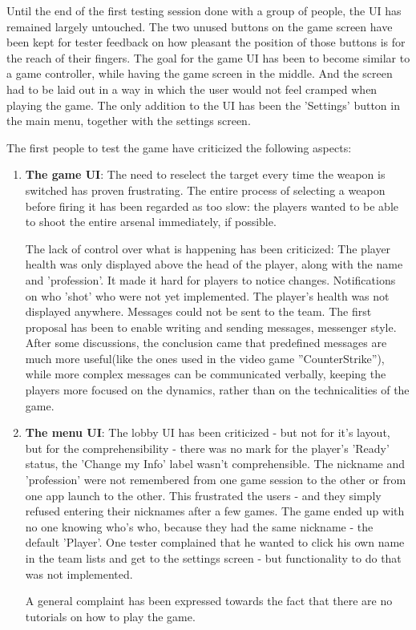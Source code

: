 Until the end of the first testing session done with a group of people, the UI
has remained largely untouched. The two unused buttons on the game screen have
been kept for tester feedback on how pleasant the position of those buttons is
for the reach of their fingers. The goal for the game UI has been to become
similar to a game controller, while having the game screen in the middle. And
the screen had to be laid out in a way in which the user would not feel cramped
when playing the game. The only addition to the UI has been the 'Settings'
button in the main menu, together with the settings screen.\newline

The first people to test the game have criticized the following aspects:
\begin{enumerate}
  \item \textbf {The game UI}: The need to reselect the target every time the
  weapon is switched has proven frustrating. The entire process of selecting
  a weapon before firing it has been regarded as too slow: the players wanted to
  be able to shoot the entire arsenal immediately, if possible.\newline
     
  The lack of control over what is happening has been criticized: The player
  health was only displayed above the head of the player, along with the name
  and 'profession'. It made it hard for players to notice changes. Notifications
  on who 'shot' who were not yet implemented. The player's health was not
  displayed anywhere. Messages could not be sent to the team. The first proposal
  has been to enable writing and sending messages, messenger style. After some
  discussions, the conclusion came that predefined messages are much more
  useful(like the ones used in the video game ''CounterStrike''), while more
  complex messages can be communicated verbally, keeping the players more
  focused on the dynamics, rather than on the technicalities of the game.
  
  \item \textbf{The menu UI}: The lobby UI has been criticized - but not for
  it's layout, but for the comprehensibility - there was no mark for the
  player's 'Ready' status, the 'Change my Info' label wasn't comprehensible. The
  nickname and 'profession' were not remembered from one game session to the
  other or from one app launch to the other. This frustrated the users - and
  they simply refused entering their nicknames after a few games. The game ended
  up with no one knowing who's who, because they had the same nickname - the
  default 'Player'. One tester complained that he wanted to click his own name
  in the team lists and get to the settings screen - but functionality
  to do that was not implemented.\newline
  
  A general complaint has been expressed towards the fact that there are no
  tutorials on how to play the game.
\end{enumerate}


